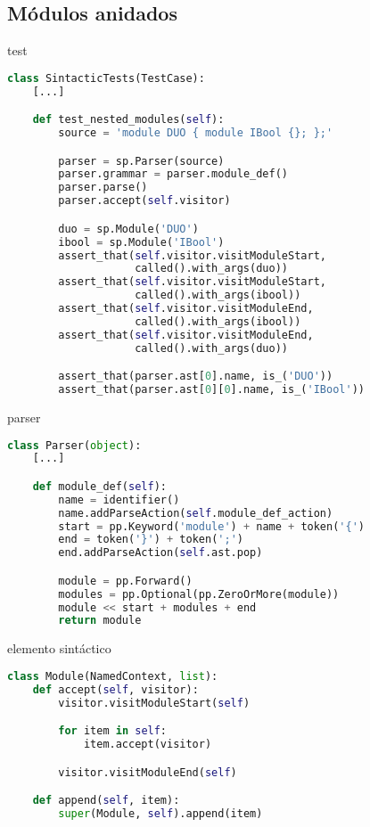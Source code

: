 \documentclass[11pt]{beamer}
\begin{document}
\subsection{Módulos anidados}

\begin{frame}[fragile]{test}
\begin{lstlisting}[language=Python]
class SintacticTests(TestCase):
    [...]

    def test_nested_modules(self):
        source = 'module DUO { module IBool {}; };'

        parser = sp.Parser(source)
        parser.grammar = parser.module_def()
        parser.parse()
        parser.accept(self.visitor)

        duo = sp.Module('DUO')
        ibool = sp.Module('IBool')
        assert_that(self.visitor.visitModuleStart,
                    called().with_args(duo))
        assert_that(self.visitor.visitModuleStart,
                    called().with_args(ibool))
        assert_that(self.visitor.visitModuleEnd,
                    called().with_args(ibool))
        assert_that(self.visitor.visitModuleEnd,
                    called().with_args(duo))

        assert_that(parser.ast[0].name, is_('DUO'))
        assert_that(parser.ast[0][0].name, is_('IBool'))
\end{lstlisting}
\end{frame}

\begin{frame}[fragile]{parser}
\begin{lstlisting}[language=Python]
class Parser(object):
    [...]

    def module_def(self):
        name = identifier()
        name.addParseAction(self.module_def_action)
        start = pp.Keyword('module') + name + token('{')
        end = token('}') + token(';')
        end.addParseAction(self.ast.pop)

        module = pp.Forward()
        modules = pp.Optional(pp.ZeroOrMore(module))
        module << start + modules + end
        return module
\end{lstlisting}
\end{frame}


\begin{frame}[fragile]{elemento sintáctico}
\begin{lstlisting}[language=Python]
class Module(NamedContext, list):
    def accept(self, visitor):
        visitor.visitModuleStart(self)

        for item in self:
            item.accept(visitor)

        visitor.visitModuleEnd(self)

    def append(self, item):
        super(Module, self).append(item)
\end{lstlisting}
\end{frame}
\end{document}
